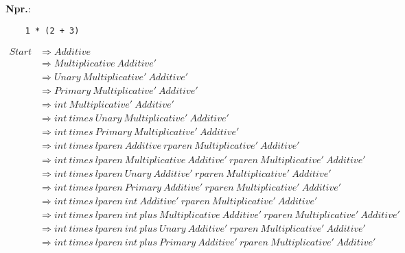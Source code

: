 \documentclass{report}
\newcommand{\Ex}{\textbf{Npr.}:\ }
\newcommand{\Spc}{\ }
\newlength{\arrow}
\newcommand{\Derive}{\Rightarrow}
\newcommand{\NT}[1]{{#1}}
\newcommand{\T}[1]{{#1}}
\begin{document}
    \newpage
    \Ex
    \begin{lstlisting}
    1 * (2 + 3)
    \end{lstlisting}
    \begin{equation*}
      \begin{aligned}
        \NT{Start} &\Derive \NT{Additive}\\
        &\Derive \NT{Multiplicative} \Spc \NT{Additive'}\\
        &\Derive \NT{Unary} \Spc \NT{Multiplicative'} \Spc \NT{Additive'}\\
        &\Derive \NT{Primary} \Spc \NT{Multiplicative'} \Spc \NT{Additive'}\\
        &\Derive \T{int} \Spc \NT{Multiplicative'} \Spc \NT{Additive'}\\
        &\Derive \T{int} \Spc \T{times} \Spc \NT{Unary} \Spc \NT{Multiplicative'} \Spc \NT{Additive'}\\
        &\Derive \T{int} \Spc \T{times} \Spc \NT{Primary} \Spc \NT{Multiplicative'} \Spc \NT{Additive'}\\
        &\Derive \T{int} \Spc \T{times} \Spc \T{lparen} \Spc \NT{Additive} \Spc \T{rparen} \Spc \NT{Multiplicative'} \Spc \NT{Additive'}\\
        &\Derive \T{int} \Spc \T{times} \Spc \T{lparen} \Spc \NT{Multiplicative} \Spc \NT{Additive'} \Spc \T{rparen} \Spc \NT{Multiplicative'} \Spc \NT{Additive'}\\
        &\Derive \T{int} \Spc \T{times} \Spc \T{lparen} \Spc \NT{Unary} \Spc \NT{Additive'} \Spc \T{rparen} \Spc \NT{Multiplicative'} \Spc \NT{Additive'}\\
        &\Derive \T{int} \Spc \T{times} \Spc \T{lparen} \Spc \NT{Primary} \Spc \NT{Additive'} \Spc \T{rparen} \Spc \NT{Multiplicative'} \Spc \NT{Additive'}\\
        &\Derive \T{int} \Spc \T{times} \Spc \T{lparen} \Spc \T{int} \Spc \NT{Additive'} \Spc \T{rparen} \Spc \NT{Multiplicative'} \Spc \NT{Additive'}\\
        &\Derive \T{int} \Spc \T{times} \Spc \T{lparen} \Spc \T{int} \Spc \T{plus} \Spc \NT{Multiplicative} \Spc \NT{Additive'} \Spc \T{rparen} \Spc \NT{Multiplicative'} \Spc \NT{Additive'}\\
        &\Derive \T{int} \Spc \T{times} \Spc \T{lparen} \Spc \T{int} \Spc \T{plus} \Spc \NT{Unary} \Spc \NT{Additive'} \Spc \T{rparen} \Spc \NT{Multiplicative'} \Spc \NT{Additive'}\\
        &\Derive \T{int} \Spc \T{times} \Spc \T{lparen} \Spc \T{int} \Spc \T{plus} \Spc \NT{Primary} \Spc \NT{Additive'} \Spc \T{rparen} \Spc \NT{Multiplicative'} \Spc \NT{Additive'}\\

\end{aligned}
\end{equation*}
\end{document}
